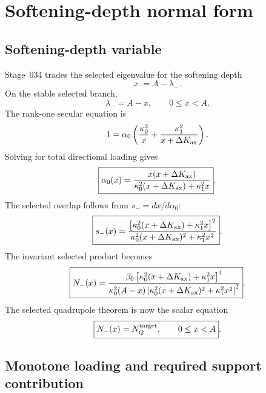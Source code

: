 \section{Softening-depth normal form}
\label{sec:part02_conservative_response:softening-depth-normal-form}

\subsection{Softening-depth variable}
\label{subsec:part02-stage034-softening-depth}

Stage~034 trades the selected eigenvalue for the softening depth
\begin{equation}
\label{eq:part02-softening-depth}
\boxed{
x:=A-\lambda_-}.
\end{equation}
On the stable selected branch,
\begin{equation}
\lambda_-=A-x,
\qquad
0\leq x<A.
\end{equation}
The rank-one secular equation is
\begin{equation}
1=\alpha_0\left(\frac{\kappa_0^2}{x}+\frac{\kappa_1^2}{x+\Delta K_{\rm ax}}\right).
\end{equation}
Solving for total directional loading gives
\begin{equation}
\label{eq:part02-alpha-of-x}
\boxed{
\alpha_0(x)=
\frac{x(x+\Delta K_{\rm ax})}
{\kappa_0^2(x+\Delta K_{\rm ax})+\kappa_1^2x}}.
\end{equation}
The selected overlap follows from \(s_-=dx/d\alpha_0\):
\begin{equation}
\label{eq:part02-s-of-x}
\boxed{
s_-(x)=
\frac{\left[\kappa_0^2(x+\Delta K_{\rm ax})+\kappa_1^2x\right]^2}
{\kappa_0^2(x+\Delta K_{\rm ax})^2+\kappa_1^2x^2}}.
\end{equation}
The invariant selected product becomes
\begin{equation}
\label{eq:part02-Nminus-x}
\boxed{
N_-(x)=
\frac{\beta_0\left[\kappa_0^2(x+\Delta K_{\rm ax})+\kappa_1^2x\right]^4}
{\kappa_0^2(A-x)\left[\kappa_0^2(x+\Delta K_{\rm ax})^2+\kappa_1^2x^2\right]^2}}.
\end{equation}
The selected quadrupole theorem is now the scalar equation
\begin{equation}
\label{eq:part02-Nminus-x-target}
\boxed{
N_-(x)=N_Q^{\rm target},
\qquad
0\leq x<A}.
\end{equation}

\subsection{Monotone loading and required support contribution}
\label{subsec:part02-alpha-monotone-support}

